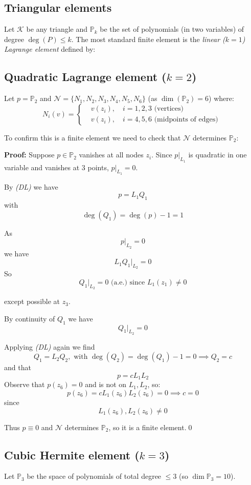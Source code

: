 
\subsection*{Triangular elements}
Let $\mathcal{K}$ be any triangle and $\mathbb{P}_k$ be the set of polynomials (in two variables) of degree $\deg(P) \leq k$.
The most standard finite element is the \emph{linear ($k=1$) Lagrange element} defined by:

\subsection*{Quadratic Lagrange element ($k=2$)}
Let $p = \mathbb{P}_2$ and $\mathcal{N} = \{N_1, N_2, N_3, N_4, N_5, N_6\}$ (as $\dim(\mathbb{P}_2) = 6$) where:
\[
    N_i(v) =
    \begin{cases}
         & v(z_i), \quad i = 1, 2, 3 \text{ (vertices) }           \\
         & v(z_i), \quad i = 4, 5, 6 \text{ (midpoints of edges) }
    \end{cases}
\]

To confirm this is a finite element we need to check that $\mathcal{N}$ determines $\mathbb{P}_2$:

\textbf{Proof:}
Suppose $p \in \mathbb{P}_2$ vanishes at all nodes $z_i$. Since $p|_{L_1}$ is quadratic in one variable and vanishes at $3$ points, $p|_{L_1} = 0$.

By \emph{(DL)} we have
\[p = L_1 Q_1\]
with
\[\deg(Q_1) = \deg(p) - 1 = 1\]

As
\[p|_{L_2} = 0\]
we have
\[L_1Q_1|_{L_2} = 0\]
So
\[Q_1|_{L_2} = 0 \text{ (a.e.)} \text{ since } L_1(z_1) \neq 0\]

except possible at $z_3$.

By continuity of $Q_1$ we have
\[Q_1|_{L_2} = 0\]

Applying \emph{(DL)} again we find
\[Q_1 = L_2 Q_2, \text{ with } \deg(Q_2) = \deg(Q_1) - 1 = 0 \implies Q_2 = c\]
and that
\[p = c L_1 L_2\]
Observe that $p(z_6) = 0$ and is not on $L_1, L_2$, so:
\[p(z_6) = c L_1(z_6) L_2(z_6) = 0 \implies c = 0\]
since
\[L_1(z_6), L_2(z_6) \neq 0\]

Thus $p \equiv 0$ and $\mathcal{N}$ determines $\mathbb{P}_2$, so it is a finite element.\qed


\subsection*{Cubic Hermite element ($k=3$)}
Let $\mathbb{P}_3$ be the space of polynomials of total degree $\le 3$ (so $\dim\mathbb{P}_3 = 10$).

